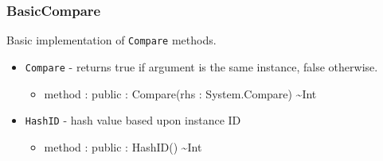 \documentclass[11pt]{article}
\begin{document}
\subsubsection{BasicCompare}
Basic implementation of \texttt{Compare} methods.
\begin{itemize}
\item \texttt{Compare} - returns true if argument is the same
  instance, false otherwise.
  \begin{itemize}
  \item method : public : Compare(rhs : System.Compare)
    \textasciitilde Int
  \end{itemize}
\item \texttt{HashID} - hash value based upon instance ID
  \begin{itemize}
  \item method : public : HashID() \textasciitilde Int
  \end{itemize}
\end{itemize}
\end{document}
